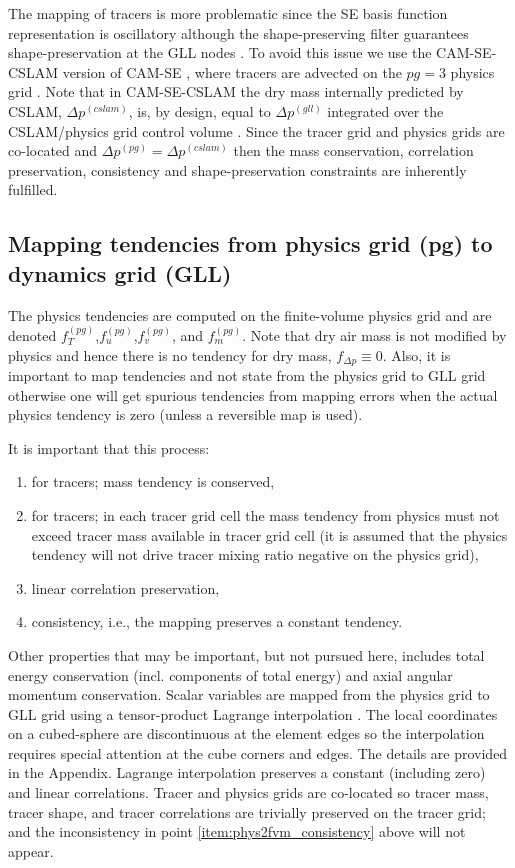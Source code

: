 \documentclass[twocol]{ametsoc}
\begin{document}
The mapping of tracers is more problematic since the SE basis function representation is oscillatory although the shape-preserving filter guarantees shape-preservation at the GLL nodes \citep{GTS2014JCP}. To avoid this issue we use the CAM-SE-CSLAM version of CAM-SE \citep[Conservative Semi-Lagrangian Multi-tracer transport scheme][]{LTOUNGK2017MWR}, where tracers are advected on the $pg=3$ physics grid {\color{red}{using the inherently mass and linear-correlation preserving CSLAM algorithm}}. Note that in CAM-SE-CSLAM the dry mass internally predicted by CSLAM, $\Delta p^{(cslam)}$, is, by design, equal to $\Delta p^{(gll)}$ integrated over the CSLAM/physics grid control volume \citep{LTOUNGK2017MWR}. Since the tracer grid and physics grids are co-located and $\Delta p^{(pg)}=\Delta p^{(cslam)}$ then the  mass conservation, correlation preservation, consistency and shape-preservation constraints are inherently fulfilled.
%
\subsection{Mapping tendencies from physics grid (pg) to dynamics grid (GLL)}
The physics tendencies are computed on the finite-volume physics grid and are denoted $f_T^{(pg)}$,$f_u^{(pg)}$,$f_v^{(pg)}$, and $f_m^{(pg)}$. Note that dry air mass is not modified by physics and hence there is no tendency for dry mass,  $f_{\Delta p}\equiv 0$. Also, it is important to map tendencies and not state from the physics grid to GLL grid otherwise one will get spurious tendencies from mapping errors when the actual physics tendency is zero (unless a reversible map is used).

It is important that this process:
\begin{enumerate}
\item for tracers; mass tendency is conserved,
\item for tracers; in each tracer grid cell the mass tendency from physics must not exceed tracer mass available in tracer grid cell (it is assumed that the physics tendency will not drive tracer mixing ratio negative on the physics grid),\label{item:phys2fvm_consistency}
\item linear correlation preservation,
\item consistency, i.e., the mapping preserves a constant tendency.
\end{enumerate}
Other properties that may be important, but not pursued here, includes total energy conservation (incl. components of total energy) and axial angular momentum conservation. Scalar variables are mapped from {\color{red}the{}} physics grid to GLL grid using a tensor-product Lagrange interpolation {\color{red}{in two dimensions (i.e., we assume that the pressure variations in the vertical are small)}}. The local coordinates on a cubed-sphere are discontinuous at the element edges so the interpolation requires special attention at the cube corners and edges. The details are provided in the Appendix. Lagrange interpolation preserves a constant (including zero) and linear correlations. Tracer and physics grids are co-located so tracer mass, tracer shape, and tracer correlations are trivially preserved on the tracer grid; and the inconsistency in point \ref{item:phys2fvm_consistency} above will not appear. 
\end{document}
